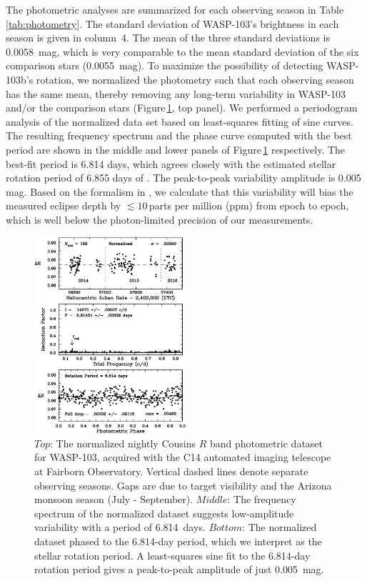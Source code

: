 \documentclass[twocolumn]{aastex61}
\begin{document}
The photometric analyses are summarized for each observing season in Table\,\ref{tab:photometry}.  The standard deviation of WASP-103's brightness in each season is given in column~4.  The mean of the three standard deviations is 0.0058~mag, which is very comparable to the mean standard deviation of the six comparison stars (0.0055~mag).  To maximize the possibility of detecting WASP-103b's rotation, we normalized the photometry such that each observing season has the same mean, thereby removing any long-term variability in WASP-103 and/or the comparison stars (Figure\,\ref{fig:photometry}, top panel).  We performed a periodogram analysis of the normalized data set based on least-squares fitting of sine curves.  The resulting frequency spectrum and the phase curve computed with the best period are shown in the middle and lower panels of Figure\,\ref{fig:photometry} respectively. The best-fit period is 6.814 days, which agrees closely with the estimated stellar rotation period of 6.855 days of \citep{gillon14}. The peak-to-peak variability amplitude is 0.005 mag.  Based on the formalism in \cite{zellem17}, we calculate that this variability will bias the measured eclipse depth by $\lesssim10$\,parts per million (ppm) from epoch to epoch, which is well below the photon-limited precision of our measurements.

\begin{figure}
\includegraphics[width = 0.5\textwidth]{Figures/photometry.eps}
\caption{$Top$: The normalized nightly Cousins $R$ band photometric dataset for WASP-103, acquired with the C14 automated imaging telescope at Fairborn Observatory. Vertical dashed lines denote separate observing seasons. Gaps are due to target visibility and the Arizona monsoon season (July - September). $Middle$: The frequency spectrum of the normalized dataset suggests low-amplitude variability with a period of 6.814~days. $Bottom$: The normalized dataset phased to the 6.814-day period, which we interpret as the stellar rotation period. A least-squares sine fit to the 6.814-day rotation period gives a peak-to-peak amplitude of just 0.005~mag.}
\label{fig:photometry}
\end{figure}
\end{document}
